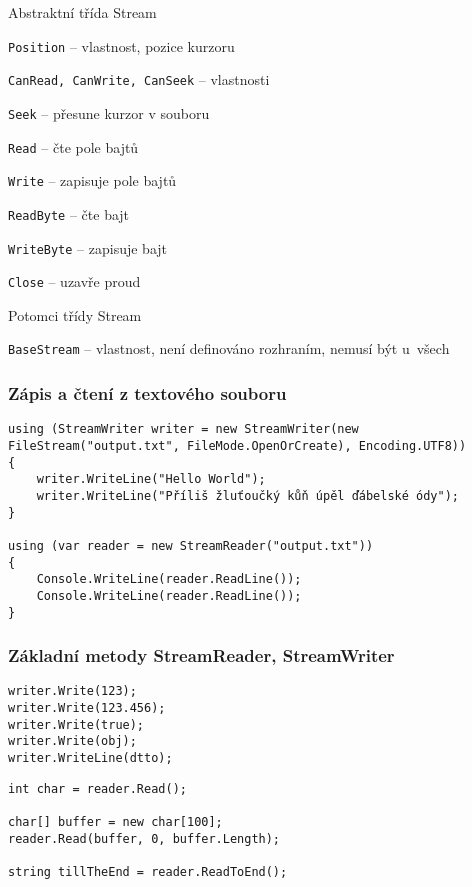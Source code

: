 \begin{frame}[fragile]
\vfill
\begin{bitemize}{Abstraktní třída Stream}
\item \lstinline|Position| -- vlastnost, pozice kurzoru
\item \lstinline|CanRead, CanWrite, CanSeek| -- vlastnosti
\item \lstinline|Seek| -- přesune kurzor v souboru
\item \lstinline|Read| -- čte pole bajtů
\item \lstinline|Write| -- zapisuje pole bajtů
\item \lstinline|ReadByte| -- čte bajt
\item \lstinline|WriteByte| -- zapisuje bajt
\item \lstinline|Close| -- uzavře proud
\end{bitemize}
\vfill
\begin{bitemize}{Potomci třídy Stream}
\item \lstinline|BaseStream| -- vlastnost, není definováno rozhraním, nemusí být u~všech
\end{bitemize}
\vfill
\end{frame}






\begin{frame}[fragile]
\frametitle{Zápis a čtení z textového souboru}
\begin{yesblock}
\begin{lstlisting}
using (StreamWriter writer = new StreamWriter(new FileStream("output.txt", FileMode.OpenOrCreate), Encoding.UTF8))
{
    writer.WriteLine("Hello World");
    writer.WriteLine("Příliš žluťoučký kůň úpěl ďábelské ódy");
}

using (var reader = new StreamReader("output.txt"))
{
    Console.WriteLine(reader.ReadLine());
    Console.WriteLine(reader.ReadLine());
}
\end{lstlisting}
\end{yesblock}
\end{frame}


\begin{frame}[fragile]
\frametitle{Základní metody StreamReader, StreamWriter}
\vfill
\begin{yesblock}
\begin{lstlisting}
writer.Write(123);
writer.Write(123.456);
writer.Write(true);
writer.Write(obj);
writer.WriteLine(dtto);
\end{lstlisting}
\end{yesblock}
\vfill
\begin{yesblock}
\begin{lstlisting}
int char = reader.Read();

char[] buffer = new char[100];
reader.Read(buffer, 0, buffer.Length);

string tillTheEnd = reader.ReadToEnd();
\end{lstlisting}
\end{yesblock}
\vfill
\end{frame}



